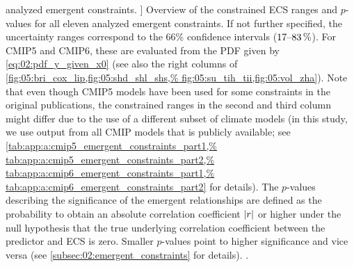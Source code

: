 \begin{table}[!b]
    analyzed emergent constraints.
  ]{
    Overview of the constrained \acf{ECS} ranges and $p$-values for all eleven
    analyzed emergent constraints. If not further specified, the uncertainty
    ranges correspond to the $66 \unit{\%}$ confidence intervals
    ($\rangeunit{17}{83}{\%}$). For \acs{CMIP}5 and \acs{CMIP}6, these are
    evaluated from the \acl{PDF} given by \cref{eq:02:pdf_y_given_x0} (see also
    the right columns of \cref{fig:05:bri_cox_lip,fig:05:shd_shl_shs,%
      fig:05:su_tih_tii,fig:05:vol_zha}). Note that even though \acs{CMIP}5
    models have been used for some constraints in the original publications,
    the constrained ranges in the second and third column might differ due to
    the use of a different subset of climate models (in this study, we use
    output from all \acs{CMIP} models that is publicly available; see
    \cref{tab:app:a:cmip5_emergent_constraints_part1,%
      tab:app:a:cmip5_emergent_constraints_part2,%
      tab:app:a:cmip6_emergent_constraints_part1,%
      tab:app:a:cmip6_emergent_constraints_part2} for details). The $p$-values
    describing the significance of the emergent relationships are defined as
    the probability to obtain an absolute correlation coefficient $\abs*{r}$
    or higher under the null hypothesis that the true underlying correlation
    coefficient between the predictor and \acs{ECS} is zero. Smaller
    $p$-values point to higher significance and vice versa (see
    \cref{subsec:02:emergent_constraints} for details).
    .
  }
  \label{tab:05:overview_results}
\end{table}

